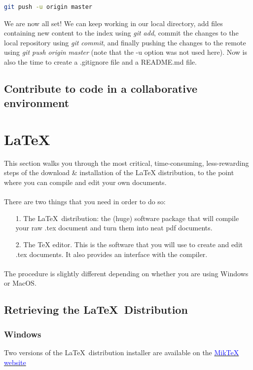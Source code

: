 \documentclass{report}
\begin{document}
\begin{lstlisting}[language=bash, caption=Push the local repository to the remote ]
git push -u origin master
\end{lstlisting}

We are now all set! We can keep working in our local directory, add files containing new content to the index using \textit{git add}, commit the changes to the local repository using \textit{git commit}, and finally pushing the changes to the remote using \textit{git push origin master} (note that the -u option was not used here). Now is also the time to create a .gitignore file and a README.md file.
\subsection{Contribute to code in a collaborative environment}
\section{\LaTeX\ }


This section walks you through the most critical, time-consuming, less-rewarding steps of  the download \& installation of the LaTeX distribution, to the point where you can compile and edit your own documents. 
\paragraph{}
There are two things that you need in order to do so:
\begin{itemize}
\item[1.] The \LaTeX\ distribution: the (huge) software package that will compile your raw .tex document and turn them into  neat pdf documents.
\item[2.]  The TeX editor. This is the software that you will use to create and edit .tex documents. It also provides an interface with the compiler.
\end{itemize}
\paragraph{}
The procedure is slightly different depending on whether you are using Windows or MacOS.

\subsection{Retrieving the \LaTeX\ Distribution }

\subsubsection*{Windows}
Two versions of the \LaTeX\ distribution installer are available on the  \href{http://www.miktex.org/download
}{\textcolor{blue}{MikTeX website}}
\end{document}

